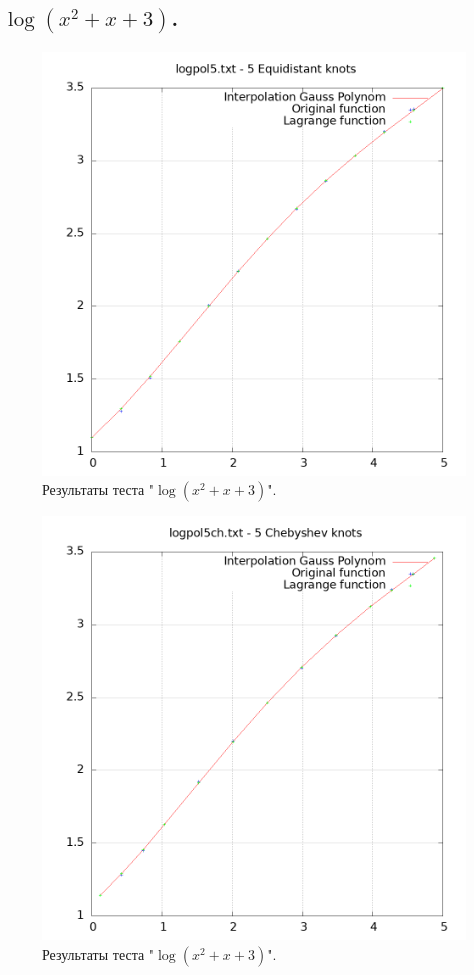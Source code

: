 \documentclass[14pt,a4paper]{extarticle}
\newcommand{\1}{\mathbbm{1}}
\begin{document}
    \subsection{$\log(x^2 + x + 3)$.}
    \begin{figure}
        \centering
        \includegraphics[scale=0.5]{Images/logpol5.txt.png}
        \caption{Результаты теста "$\log(x^2 + x + 3)$".}
    \end{figure}

    \begin{figure}
        \centering
        \includegraphics[scale=0.5]{Images/logpol5ch.txt.png}
        \caption{Результаты теста "$\log(x^2 + x + 3)$".}
    \end{figure}
\end{document}
